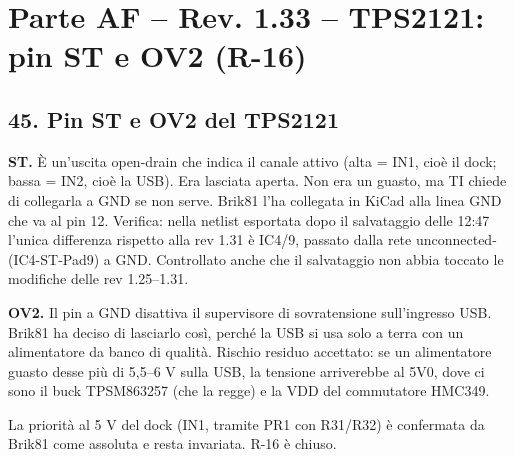 \clearpage
\section[Parte AF – Rev. 1.33 – TPS2121: pin ST e OV2 (R-16)]{Parte AF – Rev. 1.33 – TPS2121: pin ST e OV2 (R-16)}

\subsection[45. Pin ST e OV2 del TPS2121]{45. Pin ST e OV2 del TPS2121}

\textbf{ST.} È un'uscita open-drain che indica il canale attivo (alta = IN1, cioè il dock; bassa = IN2, cioè la USB). Era lasciata aperta. Non era un guasto, ma TI chiede di collegarla a GND se non serve. Brik81 l'ha collegata in KiCad alla linea GND che va al pin 12. Verifica: nella netlist esportata dopo il salvataggio delle 12:47 l'unica differenza rispetto alla rev 1.31 è IC4/\allowbreak{}9, passato dalla rete unconnected-(IC4-ST-Pad9) a GND. Controllato anche che il salvataggio non abbia toccato le modifiche delle rev 1.25–1.31.

\textbf{OV2.} Il pin a GND disattiva il supervisore di sovratensione sull'ingresso USB. Brik81 ha deciso di lasciarlo così, perché la USB si usa solo a terra con un alimentatore da banco di qualità. Rischio residuo accettato: se un alimentatore guasto desse più di 5,5–6 V sulla USB, la tensione arriverebbe al 5V0, dove ci sono il buck TPSM863257 (che la regge) e la VDD del commutatore HMC349.

La priorità al 5 V del dock (IN1, tramite PR1 con R31/\allowbreak{}R32) è confermata da Brik81 come assoluta e resta invariata. R-16 è chiuso.
